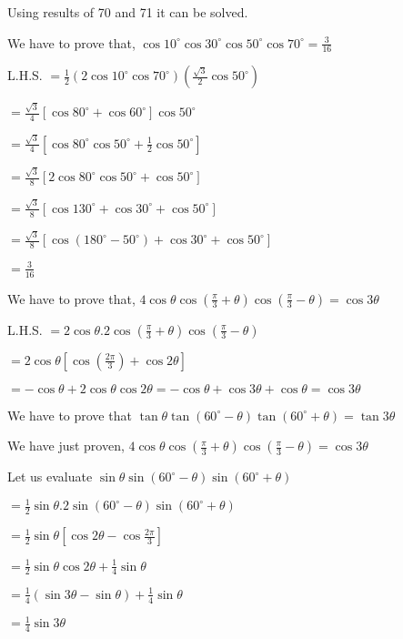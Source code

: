   Using results of 70 and 71 it can be solved.

\item We have to prove that, $\cos10^\circ\cos30^\circ\cos50^\circ\cos70^\circ = \frac{3}{16}$

  L.H.S. $= \frac{1}{2}(2\cos10^\circ\cos70^\circ)(\frac{\sqrt{3}}{2}\cos50^\circ)$

  $= \frac{\sqrt{3}}{4}[\cos80^\circ + \cos60^\circ]\cos50^\circ$

  $= \frac{\sqrt{3}}{4}[\cos80^\circ\cos50^\circ + \frac{1}{2}\cos50^\circ]$

  $= \frac{\sqrt{3}}{8}[2\cos80^\circ\cos50^\circ + \cos50^\circ]$

  $= \frac{\sqrt{3}}{8}[\cos 130^\circ + \cos30^\circ + \cos50^\circ]$

  $= \frac{\sqrt{3}}{8}[\cos(180^\circ - 50^\circ) + \cos30^\circ + \cos50^\circ]$

  $= \frac{3}{16}$

\item We have to prove that, $4\cos\theta\cos\left(\frac{\pi}{3} + \theta\right)\cos\left(\frac{\pi}{3} - \theta\right) =
  \cos3\theta$

  L.H.S. $= 2\cos\theta.2\cos\left(\frac{\pi}{3} + \theta\right)\cos\left(\frac{\pi}{3} - \theta\right)$

  $= 2\cos\theta\left[\cos\left(\frac{2\pi}{3}\right) + \cos2\theta\right]$

  $= -\cos\theta + 2\cos\theta\cos2\theta = -\cos\theta + \cos3\theta + \cos\theta = \cos3\theta$

\item We have to prove that $\tan\theta\tan(60^\circ - \theta)\tan(60^\circ + \theta) = \tan3\theta$

  We have just proven, $4\cos\theta\cos\left(\frac{\pi}{3} + \theta\right)\cos\left(\frac{\pi}{3} - \theta\right) =
  \cos3\theta$

  Let us evaluate $\sin\theta\sin(60^\circ - \theta)\sin(60^\circ + \theta)$

  $= \frac{1}{2}\sin\theta.2\sin(60^\circ - \theta)\sin(60^\circ + \theta)$

  $= \frac{1}{2}\sin\theta\left[\cos2\theta - \cos\frac{2\pi}{3}\right]$

  $= \frac{1}{2}\sin\theta\cos2\theta + \frac{1}{4}\sin\theta$

  $= \frac{1}{4}(\sin3\theta - \sin\theta) + \frac{1}{4}\sin\theta$

  $= \frac{1}{4}\sin3\theta$


